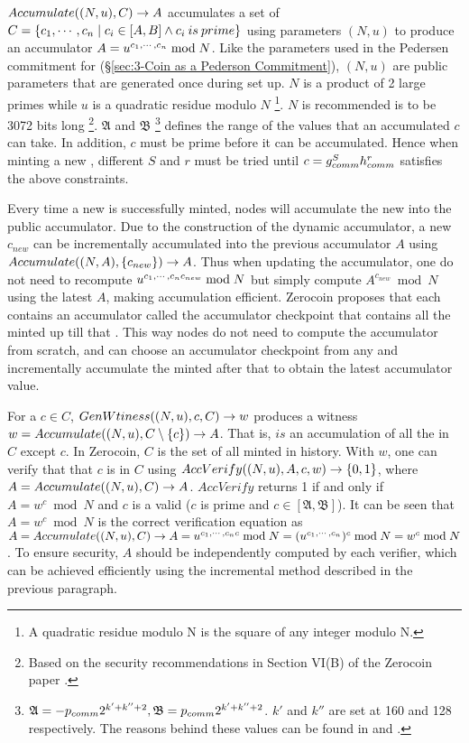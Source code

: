 $Accumulate((N,\allowbreak u),\allowbreak C)\rightarrow A$ accumulates a set of  $C=\lbrace c_1,\cdots,c_n \mid c_i \in [A,B] \wedge c_i \: is \: prime \rbrace$ using parameters $(N,u)$ to produce an accumulator $A=u^{c_1,\cdots,c_n}\bmod{N}$. Like the parameters used in the Pedersen commitment for  (\S\ref{sec:3-Coin as a Pederson Commitment}), $(N,u)$ are public parameters that are generated once during set up. $N$ is a product of 2 large primes while $u$ is a quadratic residue modulo $N$ \footnote{A quadratic residue modulo N is the square of any integer modulo N.}. $N$ is recommended is to be 3072 bits long \footnote{Based on the security recommendations in Section VI(B) of the Zerocoin paper \cite{Miers2013}.}. $\mathfrak{A}$ and $\mathfrak{B}$ \footnote{$\mathfrak{A}=-p_{comm}2^{k'+k''+2},\mathfrak{B}=p_{comm}2^{k'+k''+2}$. $k'$ and $k''$ are set at 160 and 128 respectively. The reasons behind these values can be found in \cite{Miers2013} and \cite{JanCamenisch12002}.} defines the range of the values that an accumulated \kwCoin{} $c$ can take. In addition, $c$ must be prime before it can be accumulated. Hence when minting a new \kwCoin{}, different $S$ and $r$ must be tried until $c=g_{comm}^{S}h_{comm}^{r}$ satisfies the above constraints. 

Every time a new \kwCoin{} is successfully minted, nodes will accumulate the new \kwCoin{} into the public accumulator. Due to the construction of the dynamic accumulator, a new \kwCoin{} $c_{new}$ can be incrementally accumulated \cite{JanCamenisch12002} into the previous accumulator $A$ using $Accumulate((N,\allowbreak A),\allowbreak\{c_{new}\})\rightarrow A$. Thus when updating the accumulator, one do not need to recompute $u^{c_1,\cdots,c_nc_{new}}\bmod{N}$ but simply compute $A^{c_{new}}\bmod{N}$ using the latest $A$, making accumulation efficient. Zerocoin proposes that each \kwBlock{} contains an accumulator called the accumulator checkpoint that contains all the  minted up till that \kwBlock{}. This way nodes do not need to compute the accumulator from scratch, and can choose an accumulator checkpoint from any \kwBlock{} and incrementally accumulate the  minted after that \kwBlock{} to obtain the latest accumulator value.

For a \kwCoin{} $c\in C$, $GenWtiness((N,u),c,C)\rightarrow w$ produces a witness $w=Accumulate((N,\allowbreak u),\allowbreak C\setminus\{c\})\rightarrow A$. That is, $is$ an accumulation of all the  in $C$ except $c$. In Zerocoin, $C$ is the set of all minted  in history. With $w$, one can verify that that $c$ is in $C$ using $AccVerify((N,\allowbreak u),A,c,w)\rightarrow \{0,1\}$, where $A=Accumulate((N,\allowbreak u),\allowbreak C)\rightarrow A$. $AccVerify$ returns 1 if and only if $A=w^{c}\bmod{N}$ and $c$ is a valid \kwCoin{} ($c$ is prime and $c\in[\mathfrak{A},\mathfrak{B}]$). It can be seen that $A=w^{c}\bmod{N}$ is the correct verification equation as $A=Accumulate((N,\allowbreak u),\allowbreak C)\rightarrow A=u^{c_1,\cdots,c_nc}\bmod{N}=(u^{c_1,\cdots,c_n})^c\bmod{N}=w^{c}\bmod{N}$. To ensure security, $A$ should be independently computed by each verifier, which can be achieved efficiently using the incremental method described in the previous paragraph.

